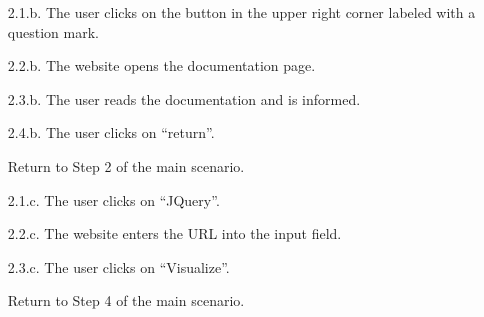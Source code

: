 \documentclass[11pt]{scrartcl}
\begin{document}
\begin{description}[leftmargin=!,labelwidth=\widthof{\bfseries Frequency of use:}]
\begin{enumerate}
			\item[2.1.b.] The user clicks on the button in the upper right corner labeled with a question mark.
			\item[2.2.b.] The website opens the documentation page.
			\item[2.3.b.] The user reads the documentation and is informed.
			\item[2.4.b.] The user clicks on \enquote{return}.
			\item[] Return to Step 2 of the main scenario.
						
			\item[2.1.c.] The user clicks on \enquote{JQuery}.
			\item[2.2.c.] The website enters the URL into the input field.
			\item[2.3.c.] The user clicks on \enquote{Visualize}.
			\item[] Return to Step 4 of the main scenario.
			
		
		\end{enumerate}


\end{description}
\end{document}
